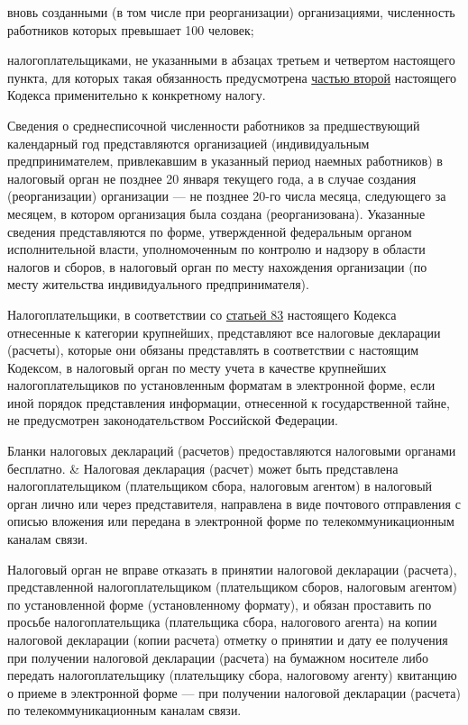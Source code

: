 \documentclass{report}
\begin{document}
\par вновь созданными (в том числе при реорганизации) организациями, численность работников которых превышает 100 человек;
\par налогоплательщиками, не указанными в абзацах третьем и четвертом настоящего пункта, для которых такая обязанность предусмотрена \ul{частью второй} настоящего Кодекса применительно к конкретному налогу.
\par Сведения о среднесписочной численности работников за предшествующий календарный год представляются организацией (индивидуальным предпринимателем, привлекавшим в указанный период наемных работников) в налоговый орган не позднее 20 января текущего года, а в случае создания (реорганизации) организации --- не позднее 20-го числа месяца, следующего за месяцем, в котором организация была создана (реорганизована). Указанные сведения представляются по форме, утвержденной федеральным органом исполнительной власти, уполномоченным по контролю и надзору в области налогов и сборов, в налоговый орган по месту нахождения организации (по месту жительства индивидуального предпринимателя).
\par Налогоплательщики, в соответствии со \ul{статьей 83} настоящего Кодекса отнесенные к категории крупнейших, представляют все налоговые декларации (расчеты), которые они обязаны представлять в соответствии с настоящим Кодексом, в налоговый орган по месту учета в качестве крупнейших налогоплательщиков по установленным форматам в электронной форме, если иной порядок представления информации, отнесенной к государственной тайне, не предусмотрен законодательством Российской Федерации.
\par Бланки налоговых деклараций (расчетов) предоставляются налоговыми органами бесплатно.
& Налоговая декларация (расчет) может быть представлена налогоплательщиком (плательщиком сбора, налоговым агентом) в налоговый орган лично или через представителя, направлена в виде почтового отправления с описью вложения или передана в электронной форме по телекоммуникационным каналам связи.
\par Налоговый орган не вправе отказать в принятии налоговой декларации (расчета), представленной налогоплательщиком (плательщиком сборов, налоговым агентом) по установленной форме (установленному формату), и обязан проставить по просьбе налогоплательщика (плательщика сбора, налогового агента) на копии налоговой декларации (копии расчета) отметку о принятии и дату ее получения при получении налоговой декларации (расчета) на бумажном носителе либо передать налогоплательщику (плательщику сбора, налоговому агенту) квитанцию о приеме в электронной форме --- при получении налоговой декларации (расчета) по телекоммуникационным каналам связи.
\end{document}
